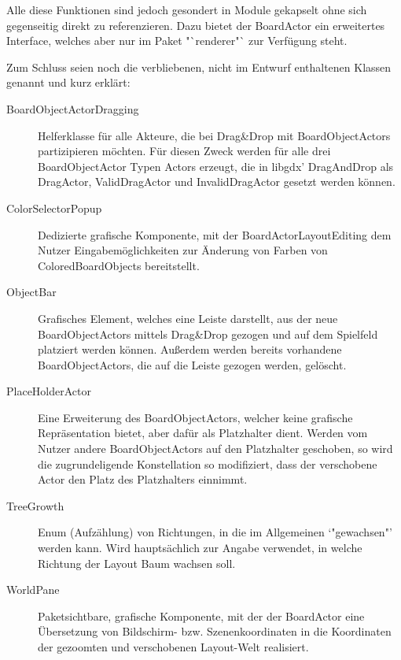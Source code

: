 Alle diese Funktionen sind jedoch gesondert in Module gekapselt ohne sich gegenseitig direkt zu referenzieren.
Dazu bietet der BoardActor ein erweitertes Interface, welches aber nur im Paket "`renderer"` zur Verfügung steht.


Zum Schluss seien noch die verbliebenen, nicht im Entwurf enthaltenen Klassen genannt und kurz erklärt:
\begin{description}
\item[BoardObjectActorDragging]
	Helferklasse für alle Akteure, die bei Drag\&Drop mit BoardObjectActors partizipieren möchten.
	Für diesen Zweck werden für alle drei BoardObjectActor Typen Actors erzeugt, die in libgdx' DragAndDrop als DragActor, ValidDragActor und InvalidDragActor gesetzt werden können.
\item[ColorSelectorPopup]
	Dedizierte grafische Komponente, mit der BoardActorLayoutEditing dem Nutzer Eingabemöglichkeiten zur Änderung von Farben von ColoredBoardObjects bereitstellt.
\item[ObjectBar]
	Grafisches Element, welches eine Leiste darstellt, aus der neue BoardObjectActors mittels Drag\&Drop gezogen und auf dem Spielfeld platziert werden können.
	Außerdem werden bereits vorhandene BoardObjectActors, die auf die Leiste gezogen werden, gelöscht.
\item[PlaceHolderActor]
	Eine Erweiterung des BoardObjectActors, welcher keine grafische Repräsentation bietet, aber dafür als Platzhalter dient.
	Werden vom Nutzer andere BoardObjectActors auf den Platzhalter geschoben, so wird die zugrundeligende Konstellation so modifiziert, dass der verschobene Actor den Platz des Platzhalters einnimmt.
\item[TreeGrowth]
	Enum (Aufzählung) von Richtungen, in die im Allgemeinen `"gewachsen"' werden kann. 
	Wird hauptsächlich zur Angabe verwendet, in welche Richtung der Layout Baum wachsen soll.
\item[WorldPane]
	Paketsichtbare, grafische Komponente, mit der der BoardActor eine Übersetzung von Bildschirm- bzw. Szenenkoordinaten in die Koordinaten der gezoomten und verschobenen Layout-Welt realisiert.
\end{description}
